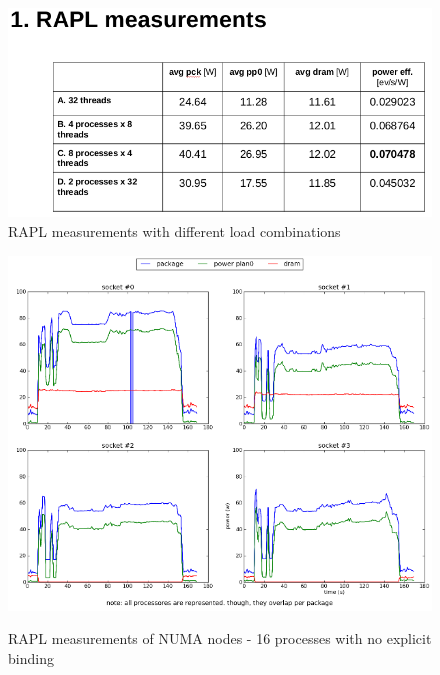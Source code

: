 \begin{figure}[h!]
  \centering
    \includegraphics[width=150mm]{"img/cern/rapl"}
    \caption{RAPL measurements with different load combinations }
    \label{fig:nf_ss}
\end{figure}

\begin{figure}[h!]
  \centering
    \includegraphics[width=150mm]{"img/numa/16proc_no_binding"}
    \label{fig:nf_ss}
    \caption{RAPL measurements of NUMA nodes - 16 processes with no explicit
binding}
\end{figure}


